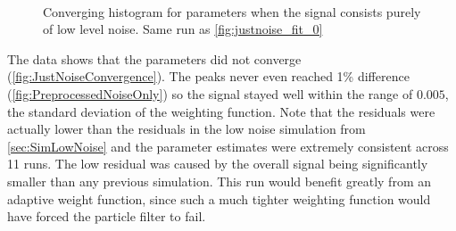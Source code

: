 \begin{figure}[H]
\centering
{}\\
\end{figure}

\begin{figure}[H]
\centering
{}
\caption{Converging histogram for parameters when the signal consists purely of low level noise.
Same run as \autoref{fig:justnoise_fit_0}}
\label{fig:JustNoiseConvergence}
\end{figure}

The data shows that the parameters did not converge
(\autoref{fig:JustNoiseConvergence}).
The peaks never even reached 1\% difference
(\autoref{fig:PreprocessedNoiseOnly}) so  the signal  stayed
well within the range of $0.005$, the standard deviation of the weighting function.
Note that the residuals
were actually lower than the residuals in the low noise simulation from \autoref{sec:SimLowNoise}
and the parameter estimates were extremely consistent across 11 runs.
The low residual was caused by the overall
signal being significantly smaller than any previous simulation.
This run would benefit greatly from an adaptive weight function, since
such a much tighter weighting function would have forced the particle
filter to fail.


